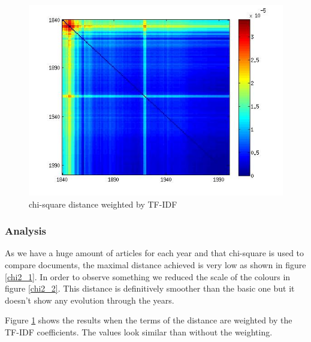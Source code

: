 \begin{figure}[H]
    \begin{minipage}[b]{0.48\linewidth}
        \includegraphics[scale=0.3]{Pictures/chi2/chi2_corrected_tfidf.jpg}
        \caption{chi-square distance weighted by TF-IDF}
        \label{chi2_tfidf}
    \end{minipage}\hfill
\end{figure}

\subsubsection{Analysis}

As we have a huge amount of articles for each year and that chi-square is used to compare documents, the maximal distance achieved is very low as shown in figure \ref{chi2_1}. In order to observe something we reduced the scale of the colours in figure \ref{chi2_2}. This distance is definitively smoother than the basic one but it doesn't show any evolution through the years.

Figure \ref{chi2_tfidf} shows the results when the terms of the distance are weighted by the TF-IDF coefficients. The values look similar than without the weighting.